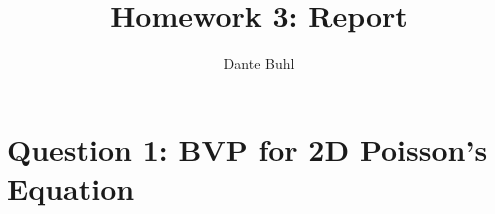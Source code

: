 \documentclass{article}
\title{Homework 3: Report}
\author{Dante Buhl}
\begin{document}
\newcommand{\bs}[1]{\boldsymbol{#1}}
\newcommand{\bmp}[1]{\begin{minipage}{#1\textwidth}}
\newcommand{\emp}{\end{minipage}}
\newcommand{\R}{\mathbb{R}}
\newcommand{\C}{\mathbb{C}}
\newcommand{\N}{\mathcal{N}}
\newcommand{\I}{\mathrm{I}}
\newcommand{\K}{\bs{\mathrm{K}}}
\newcommand{\m}{\bs{\mu}_*}
\newcommand{\s}{\bs{\Sigma}_*}
\newcommand{\dt}{\Delta t}
\newcommand{\tr}[1]{\text{Tr}(#1)}
\newcommand{\Tr}[1]{\text{Tr}(#1)}

\maketitle

\section*{Question 1: BVP for 2D Poisson's Equation}
\end{document}
